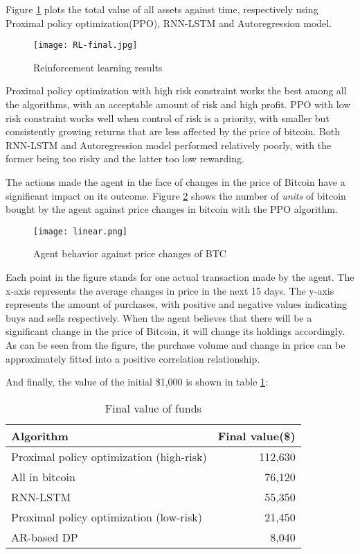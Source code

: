 \documentclass{mcmthesis}
\begin{document}
Figure \ref{RL-Results}  plots the total value of all assets against time,
respectively using Proximal policy optimization(PPO), RNN-LSTM and Autoregression model.

\begin{figure}[h]
  \small
  \centering
  \texttt{[image: RL-final.jpg]}
  \caption{Reinforcement learning results} \label{RL-Results}
\end{figure}

Proximal policy optimization with high risk constraint works the best among all the algorithms, with an acceptable amount of risk and high profit. PPO with low risk constraint works well when control of risk is a priority, with smaller but consistently growing returns that are less affected by the price of bitcoin. Both RNN-LSTM and Autoregression model performed relatively poorly, with the former being too risky and the latter too low rewarding.

The actions made the agent in the face of changes in the price of Bitcoin have a significant impact on its outcome.
Figure \ref{BTC} shows the number of \textit{units} of bitcoin bought by the agent against price changes in bitcoin with the PPO algorithm.

\begin{figure}[h]
  \small
  \centering
  \texttt{[image: linear.png]}
  \caption{Agent behavior against price changes of BTC} \label{BTC}
\end{figure}

Each point in the figure stands for one actual transaction made by the agent.
The x-axis represents the average changes in price in the next 15 days.
The y-axis represents the amount of purchases, with positive and negative values indicating buys and sells respectively.
When the agent believes that there will be a significant change in the price of Bitcoin, it will change its holdings accordingly.
As can be seen from the figure, the purchase volume and change in price can be approximately fitted into a positive correlation relationship.

And finally, the value of the initial \$1,000 is shown in table \ref{final-value}:

\begin{table}[H]
  \centering
  \begin{tabular}{@{}lr@{}}
    \toprule
    Algorithm & Final value(\$) \\
    \midrule
    Proximal policy optimization (high-risk) & 112,630 \\
    {\color{gray} All in bitcoin} & {\color{gray} 76,120} \\
    RNN-LSTM & 55,350 \\
    Proximal policy optimization (low-risk) & 21,450 \\
    AR-based DP & 8,040 \\
    \bottomrule
  \end{tabular}
  \caption{Final value of funds}
  \label{final-value}
\end{table}
\end{document}
